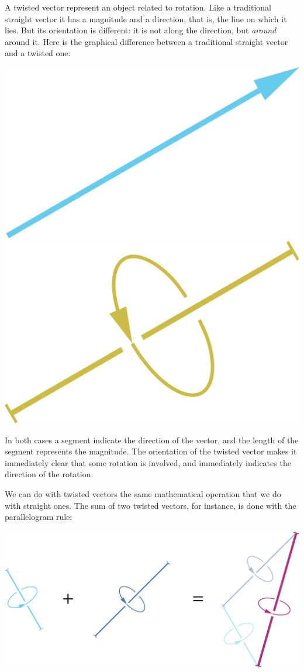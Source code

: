 \documentclass[a4paper,12pt,%
onecolumn,oneside,%
british%
]{memoir}
\renewcommand*{\|}[1][]{\nonscript\:#1\vert\nonscript\:\mathopen{}}
\begin{document}
A twisted vector represent an object related to rotation. Like a traditional straight vector it has a magnitude and a direction, that is, the line on which it lies. But its orientation is different: it is not along the direction, but \emph{around} around it. Here is the graphical difference between a traditional straight vector and a twisted one:
\begin{center}
\includegraphics[width=0.34\linewidth]{images/io-vector.pdf}%
\hspace*{0.16\linewidth}\includegraphics[width=0.34\linewidth]{images/oo-vector.pdf}%
%
\\\footnotesize
{}\hspace*{0.5\linewidth}
\end{center}
In both cases a segment indicate the direction of the vector, and the length of the segment represents the magnitude. The orientation of the twisted vector makes it immediately clear that some rotation is involved, and immediately indicates the direction of the rotation.

We can do with twisted vectors the same mathematical operation that we do with straight ones. The sum of two twisted vectors, for instance, is done with the parallelogram rule:
\begin{center}
\includegraphics[width=0.67\linewidth]{images/tvectorsum.pdf}%
\end{center}
\end{document}
